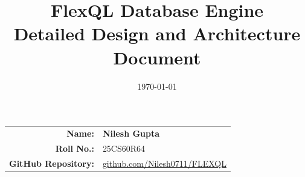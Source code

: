 \documentclass[11pt,a4paper]{article}
\title{\textbf{FlexQL Database Engine}\\[0.4em]\Large Detailed Design and Architecture Document}
\author{}
\date{\today}
\begin{document}
\maketitle

\vspace{-1.2em}
\begin{center}
\renewcommand{\arraystretch}{1.25}
\begin{tabular}{rl}
\textbf{Name:} & \textbf{Nilesh Gupta} \\
\textbf{Roll No.:} & 25CS60R64 \\
\textbf{GitHub Repository:} & \href{https://github.com/Nilesh0711/FLEXQL}{github.com/Nilesh0711/FLEXQL} \\
\end{tabular}
\end{center}
\vspace{0.6em}
\end{document}
